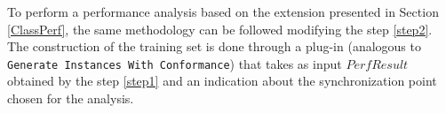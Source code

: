 \documentclass{llncs}
\begin{document}
To perform a performance analysis based on the extension presented in Section \ref{ClassPerf}, the same methodology can be followed modifying the step \ref{step2}. The construction of the training set is done through a plug-in (analogous to \texttt{Generate Instances With Conformance}) that takes as input $PerfResult$ obtained by the step \ref{step1} and an indication about the synchronization point chosen for the analysis.


 
\end{document}

